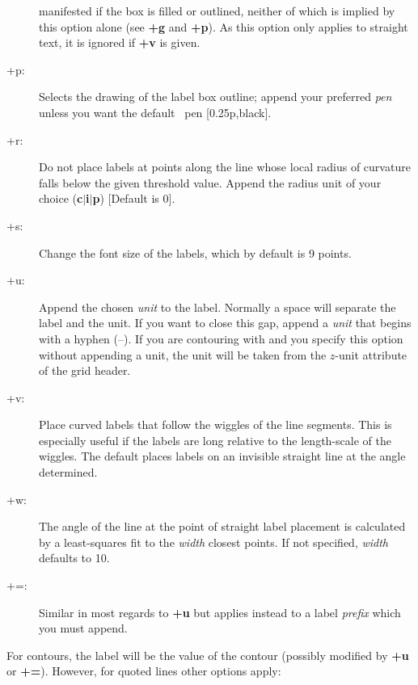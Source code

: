 \begin{description}
manifested if the box is filled or outlined, neither of which is implied by this option alone (see {\bf +g}
and {\bf +p}).  As this option only applies to straight text, it is ignored if {\bf +v} is given.
\item [+p:] Selects the drawing of the label box outline; append your preferred {\it pen} unless you
want the default \GMT\ pen [0.25p,black].
\item [+r:] Do not place labels at points along the line whose local radius of curvature falls below
the given threshold value.  Append the radius unit of your choice ({\bf c$|$i$|$p}) [Default is 0].
\item [+s:] Change the font size of the labels, which by default is 9 points.
\item [+u:] Append the chosen {\it unit} to the label.  Normally a space will separate the label
and the unit.  If you want to close this gap, append a {\it unit} that begins with a hyphen (--).
If you are contouring with  and you specify this option without appending a unit, the unit will be taken from the
$z$-unit attribute of the grid header.
\item [+v:]  Place curved labels that follow the wiggles of the line segments.  This is especially
useful if the labels are long relative to the length-scale of the wiggles.  The default places labels
on an invisible straight line at the angle determined.
\item [+w:] The angle of the line at the point of straight label placement is calculated by a least-squares
fit to the {\it width} closest points.  If not specified, {\it width} defaults to 10.
\item [+=:]  Similar in most regards to {\bf +u} but applies instead to a label \emph{prefix} which
you must append.
\end{description}
For contours, the label will be the value of the contour (possibly modified by {\bf +u} or {\bf +=}).
However, for quoted lines other options apply:
